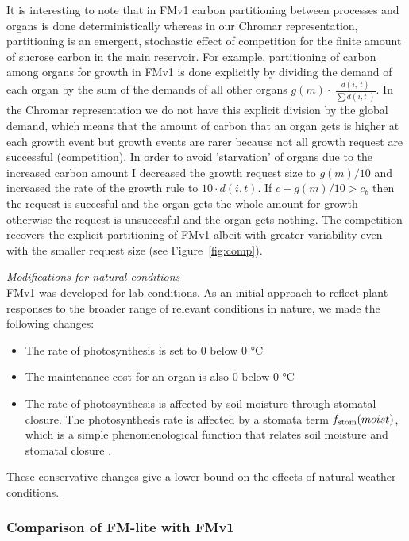 It is interesting to note that in FMv1 carbon partitioning between processes and
organs is done deterministically whereas in our Chromar representation,
partitioning is an emergent, stochastic effect of competition for the finite
amount of sucrose carbon in the main reservoir. For example, partitioning of
carbon among organs for growth in FMv1 is done explicitly by dividing the demand
of each organ by the sum of the demands of all other organs
\(g( m ) \cdot \ \frac{d(i,\ t)}{\sum_{}^{}{d(i,t\ )}}\). In the Chromar
representation we do not have this explicit division by the global demand, which
means that the amount of carbon that an organ gets is higher at each growth
event but growth events are rarer because not all growth request are successful
(competition). In order to avoid 'starvation' of organs due to the increased
carbon amount I decreased the growth request size to $g(m)/10$ and increased the
rate of the growth rule to $10 \cdot d(i, t)$. If $c - g(m)/10 > c_b$ then the
request is succesful and the organ gets the whole amount for growth otherwise
the request is unsuccesful and the organ gets nothing. The competition recovers
the explicit partitioning of FMv1 albeit with greater variability even with the
smaller request size (see Figure~\ref{fig:comp}).

\emph{Modifications for natural conditions}\\
FMv1 was developed for lab conditions. As an initial approach to reflect
plant responses to the broader range of relevant conditions in nature,
we made the following changes:

\begin{itemize}
\item
  The rate of photosynthesis is set to 0 below 0 °C
\item
  The maintenance cost for an organ is also 0 below 0 °C
\item
  The rate of photosynthesis is affected by soil moisture through
  stomatal closure. The photosynthesis rate is affected by a stomata
  term \(f_{\mathrm{stom}}(moist)\), which is a simple phenomenological
  function that relates soil moisture and stomatal closure \citep{france_mathematical_1984}.
\end{itemize}

These conservative changes give a lower bound on the effects of natural
weather conditions.

\subsubsection*{Comparison of FM-lite with FMv1}
\label{comparison-of-fm-lite-with-fmv1}

